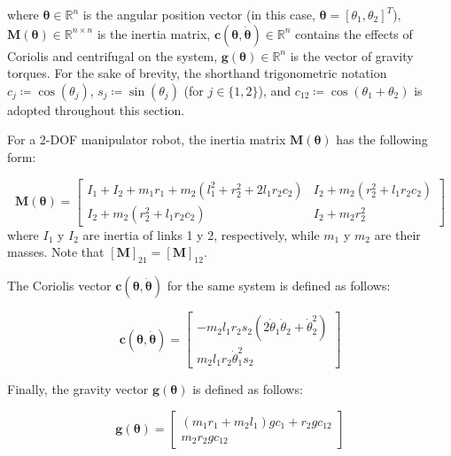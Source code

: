 \documentclass[runningheads]{llncs}
\begin{document}
where $\boldsymbol \theta \in \mathbb{R}^n$ is the angular position vector (in this case, $\boldsymbol \theta=[\theta_1,\theta_2 ]^T$), $\textbf{M}(\boldsymbol \theta)\in \mathbb{R}^{n\times n}$  is the inertia matrix, $\textbf{c}(\boldsymbol \theta , \boldsymbol{\dot \theta})\in \mathbb{R}^n$ contains the effects of Coriolis and centrifugal on the system, $\textbf{g}(\boldsymbol \theta)\in \mathbb{R}^n$ is the vector of gravity torques. For the sake of brevity, the shorthand trigonometric notation $c_j \coloneqq \cos(\theta_j)$, $s_j \coloneqq \sin(\theta_j)$ (for $j\in \{1, 2\}$), and  $c_{12} \coloneqq \cos(\theta_1 + \theta_2)$ is adopted throughout this section.

For a 2-DOF manipulator robot, the inertia matrix $\textbf{M}(\boldsymbol \theta)$ has the following form:

\begin{equation}
    \textbf{M}(\boldsymbol \theta)=\begin{bmatrix} I_1+I_2+m_1r_1+m_2(l_1^2+r_2^2+2l_1r_2c_2) & I_2+m_2(r_2^2+l_1r_2c_2) \\ I_2+m_2(r_2^2+l_1r_2c_2) & I_2+m_2r_2^2\end{bmatrix}
\end{equation}
where $I_1$ y $I_2$ are inertia of links 1 y 2, respectively, while $m_1$ y $m_2$ are their masses. Note that $[\textbf{M}]_{21}=[\textbf{M}]_{12}$.

The Coriolis vector $\textbf{c}(\boldsymbol \theta,\boldsymbol{\dot \theta})$ for the same system is defined as follows:

\begin{equation}
    \textbf{c}(\boldsymbol \theta, \boldsymbol{\dot \theta}) = \begin{bmatrix} -m_2l_1r_2s_2(2\dot \theta_1\dot \theta_2+\dot \theta_2^2) \\ m_2l_1r_2 \dot \theta_1 ^2s_2
    \end{bmatrix}
\end{equation}

Finally, the gravity vector $\textbf{g}(\boldsymbol \theta)$ is defined as follows:

\begin{equation}
    \textbf{g}(\boldsymbol \theta)=\begin{bmatrix}
        (m_1r_1+m_2l_1)g c_1 + r_2g c_{12} \\ m_2r_2g c_{12}
    \end{bmatrix}
\end{equation}
\end{document}
